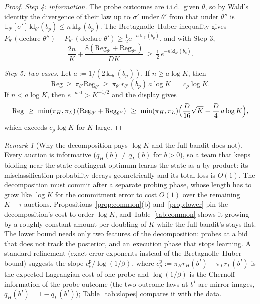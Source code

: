 \documentclass[11pt]{article}
\theoremstyle{definition}
\theoremstyle{remark}
\newtheorem{remark}{Remark}
\newcommand{\E}{\mathbb{E}}
\begin{document}
\begin{proof}
\emph{Step 4: information.} The probe outcomes are i.i.d.\ given $\theta$, so by Wald's identity the divergence of their
law up to $\sigma'$ under $\theta'$ from that under $\theta''$ is $\E_{\theta'}[\sigma']\,\mathrm{kl}_{\theta'}(b_p)\le n\,\mathrm{kl}_{\theta'}(b_p)$. The
Bretagnolle--Huber inequality gives $P_{\theta'}(\text{declare }\theta'')+P_{\theta''}(\text{declare }\theta')\ge\tfrac12e^{-n\,\mathrm{kl}_{\theta'}(b_p)}$,
and with Step 3,
\[
\frac{2n}{K}+\frac{8(\mathrm{Reg}_{\theta'}+\mathrm{Reg}_{\theta''})}{DK}\ \ge\ \tfrac12\,e^{-n\,\mathrm{kl}_{\theta'}(b_p)} .
\]

\emph{Step 5: two cases.} Let $a:=1/(2\,\mathrm{kl}_{\theta'}(b_p))$. If $n\ge a\log K$, then
\[
\mathrm{Reg}\ \ge\ \pi_{\theta'}\mathrm{Reg}_{\theta'}\ \ge\ \pi_{\theta'}\,r_{\theta'}(b_p)\,a\log K\ =\ c_\rho\log K .
\]
If $n<a\log K$, then
$e^{-n\,\mathrm{kl}}>K^{-1/2}$ and the display gives
\[
\mathrm{Reg}\ \ge\ \min(\pi_H,\pi_L)\,(\mathrm{Reg}_{\theta'}+\mathrm{Reg}_{\theta''})\ \ge\ \min(\pi_H,\pi_L)\Bigl(\frac{D}{16}\sqrt K-\frac{D}{4}\,a\log K\Bigr),
\]
which exceeds $c_\rho\log K$ for $K$ large.
\end{proof}

\begin{remark}[Why the decomposition pays $\log K$ and the full bandit does not]
Every auction is informative ($q_H(b)\ne q_L(b)$ for $b>0$), so a team that keeps bidding near the state-contingent
optimum learns the state as a by-product: its misclassification probability decays geometrically and its total loss
is $O(1)$. The decomposition must commit after a separate probing phase, whose length has to grow like $\log K$ for
the commitment error to cost $O(1)$ over the remaining $K-\tau$ auctions. Propositions~\ref{prop:common}(b)
and~\ref{prop:lower} pin the decomposition's cost to order $\log K$, and Table~\ref{tab:common} shows it growing by a
roughly constant amount per doubling of $K$ while the full bandit's stays flat. The lower bound needs only two features
of the decomposition: probes at a bid that does not track the posterior, and an execution phase that stops learning.
A standard refinement (exact error exponents instead of the Bretagnolle--Huber bound) suggests the slope
$c^{\mathrm{p}}_\rho/\log(1/\beta)$, where $c^{\mathrm p}_\rho:=\pi_Hr_H(b^I)+\pi_Lr_L(b^I)$ is the expected Lagrangian cost of one
probe and $\log(1/\beta)$ is the Chernoff information of the probe outcome (the two outcome laws at $b^I$ are mirror
images, $q_H(b^I)=1-q_L(b^I)$); Table~\ref{tab:slopes} compares it with the data.
\end{remark}
\end{document}
